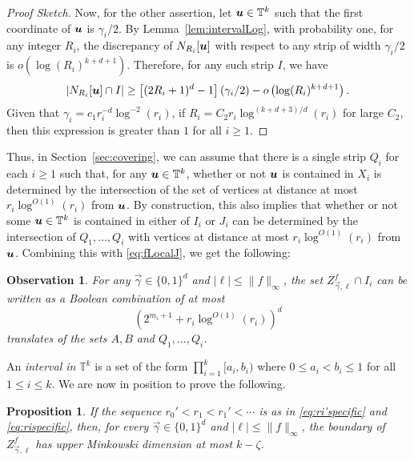 \documentclass[12pt,a4paper]{amsart}
\numberwithin{equation}{section}
\newtheorem{proposition}[equation]{Proposition}
\newtheorem{obs}[equation]{Observation}
\theoremstyle{definition}
\begin{document}
\begin{proof}[Proof Sketch]
Now, for the other assertion, let $\boldsymbol{u}\in \mathbb{T}^k$ such that the first coordinate of $\boldsymbol{u}$ is $\gamma_i/2$. By Lemma~\ref{lem:intervalLog}, with probability one, for any integer $R_i$, the discrepancy of $N_{R_i}[\boldsymbol{u}]$ with respect to any strip of width $\gamma_i/2$ is $o\left(\log(R_i)^{k+d+1}\right)$. Therefore, for any such strip $I$, we have
\[|N_{R_i}[\boldsymbol{u}]\cap I| \geq \left[(2R_i+1)^d-1\right](\gamma_i/2) - o\left(\log(R_i)^{k+d+1}\right).\]
Given that $\gamma_i=c_1r_i^{-d}\log^{-2}(r_i)$, if $R_i=C_2 r_i\log^{(k+d+3)/d}(r_i)$ for large $C_2$, then this expression is greater than $1$ for all $i\geq1$. 
\end{proof}

Thus, in Section~\ref{sec:covering}, we can assume that there is a single strip $Q_i$ for each $i\geq1$ such that, for any $\boldsymbol{u}\in \mathbb{T}^k$, whether or not $\boldsymbol{u}$ is contained in $X_i$ is determined by the intersection of the set of vertices at distance at most $r_i\log^{O(1)}(r_i)$ from $\boldsymbol{u}$. By construction, this also implies that whether or not some $\boldsymbol{u}\in\mathbb{T}^k$ is contained in either of $I_i$ or $J_i$ can be determined by the intersection of $Q_1,\dots,Q_i$ with vertices at distance at most $r_i\log^{O(1)}(r_i)$ from $\boldsymbol{u}$. Combining this with \eqref{eq:fLocalJ}, we get the following:

\begin{obs}
\label{obs:booleanABQ}
For any $\vec{\gamma}\in \{0,1\}^d$ and $|\ell|\leq \|f\|_\infty$, the set $Z_{\vec{\gamma},\ell}^f\cap I_i$ can be written as a Boolean combination of at most
\[\left(2^{m_i+1} + r_i\log^{O(1)}(r_i)\right)^d\] 
translates of the sets $A,B$ and $Q_1,\dots,Q_i$. 
\end{obs} 

An \emph{interval in} $\mathbb{T}^k$ is a set of the form $\prod_{i=1}^k[a_i,b_i)$ where $0\leq a_i<b_i\leq 1$ for all $1\leq i\leq k$.  We are now in position to prove the following.

\begin{proposition}
\label{prop:bdyDim}
If the sequence $r_0'<r_1<r_1'<\cdots$ is as in \eqref{eq:ri'specific} and \eqref{eq:rispecific}, then, for every $\vec{\gamma}\in\{0,1\}^d$ and $|\ell|\leq \|f\|_\infty$, the boundary of $Z_{\vec{\gamma},\ell}^f$ has upper Minkowski dimension at most $k-\zeta$.
\end{proposition}
\end{document}
